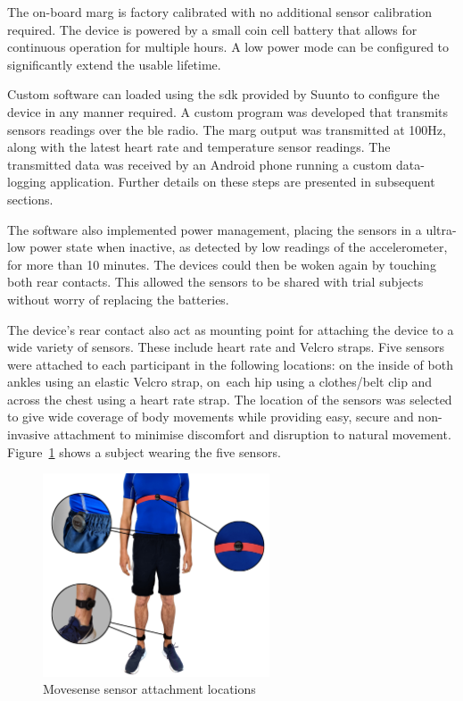 The on-board \acrshort{marg} is factory calibrated with no additional sensor calibration required. The device is powered by a small coin cell battery that allows for continuous operation for multiple hours. A low power mode can be configured to significantly extend the usable lifetime.

Custom software can loaded using the \acrfull{sdk} provided by Suunto to configure the device in any manner required. A custom program was developed that transmits sensors readings over the \acrshort{ble} radio. The \acrshort{marg} output was transmitted at 100Hz, along with the latest heart rate and temperature sensor readings. The transmitted data was received by an Android phone running a custom data-logging application. Further details on these steps are presented in subsequent sections.

The software also implemented power management, placing the sensors in a ultra-low power state when inactive, as detected by low readings of the accelerometer, for more than 10 minutes. The devices could then be woken again by touching both rear contacts. This allowed the sensors to be shared with trial subjects without worry of replacing the batteries.

The device's rear contact also act as mounting point for attaching the device to a wide variety of sensors. These include heart rate and Velcro straps. Five sensors were attached to each participant in the following locations: on the inside of both ankles using an elastic Velcro strap, on~each hip using a clothes/belt clip and across the chest using a heart rate strap. The location of the sensors was selected to give wide coverage of body movements while providing easy, secure and non-invasive attachment to minimise discomfort and disruption to natural movement. Figure~\ref{fig:methods-movesense-sensor-locations} shows a subject wearing the five sensors.

\begin{figure}[hbt]
    \centering
    \includegraphics[width=0.6\textwidth]{content/3-Methods/sensor_locations.png}
    \caption{Movesense sensor attachment locations \cite{Sherratt2021}}
    \label{fig:methods-movesense-sensor-locations}
\end{figure}


